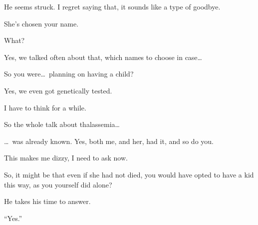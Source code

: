 He seems struck. I regret saying that, it sounds like a type of goodbye.

She's chosen your name.

What?

Yes, we talked often about that, which names to choose in case\dots

So you were\dots~planning on having a child?

Yes, we even got genetically tested.

I have to think for a while.

So the whole talk about thalassemia\dots

\dots~was already known. Yes, both me, and her, had it, and so do you.

This makes me dizzy, I need to ask now.

So, it might be that even if she had not died, you would have opted to have a kid this way, as you yourself did alone?

He takes his time to answer.

\enquote{Yes.}